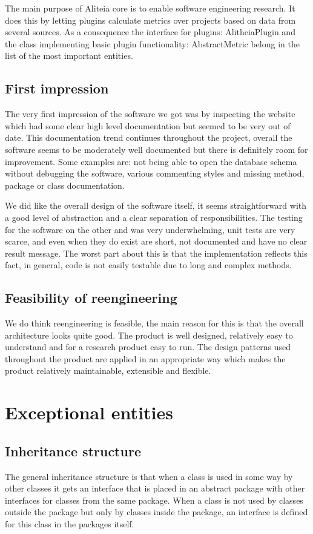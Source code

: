 \documentclass[a4paper,11pt,titlepage]{article}
\begin{document}
The main purpose of Aliteia core is to enable software engineering research. It does this by letting plugins calculate metrics over projects based on data from several sources. As a consequence the interface for plugins: AlitheiaPlugin and the class implementing basic plugin functionality: AbstractMetric belong in the list of the most important entities.

\subsection{First impression}
The very first impression of the software we got was by inspecting the website which had some clear high level documentation but seemed to be very out of date. This documentation trend continues throughout the project, overall the software seems to be moderately well documented but there is definitely room for improvement. Some examples are: not being able to open the database schema without debugging the software, various commenting styles and missing method, package or class documentation. 

We did like the overall design of the software itself, it seems straightforward with a good level of abstraction and a clear separation of responsibilities. The testing for the software on the other and was very underwhelming, unit tests are very scarce, and even when they do exist are short, not documented and have no clear result message. The worst part about this is that the implementation reflects this fact, in general, code is not easily testable due to long and complex methods.

\subsection{Feasibility of reengineering}
We do think reengineering is feasible, the main reason for this is that the overall architecture looks quite good. The product is well designed, relatively easy to understand and for a research product easy to run. The design patterns used throughout the product are applied in an appropriate way which makes the product relatively maintainable, extensible and flexible.

\section{Exceptional entities}
\subsection{Inheritance structure}
The general inheritance structure is that when a class is used in some way by other classes it gets an interface that is placed in an abstract package with other interfaces for classes from the same package. When a class is not used by classes outside the package but only by classes inside the package, an interface is defined for this class in the packages itself.
\end{document}
